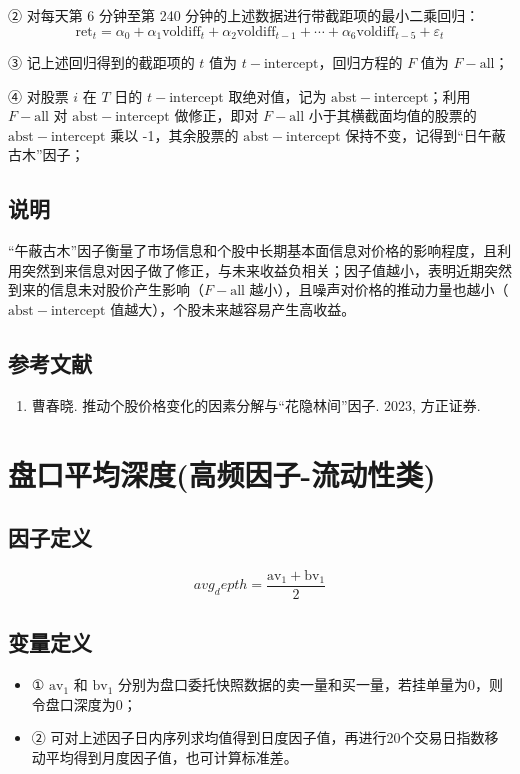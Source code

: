 \documentclass{article}
\begin{document}
② 对每天第 6 分钟至第 240 分钟的上述数据进行带截距项的最小二乘回归：
\begin{equation}
    \mathrm{ret}_t = \alpha_0 + \alpha_1 \mathrm{voldiff}_t + \alpha_2 \mathrm{voldiff}_{t-1} + \cdots + \alpha_6 \mathrm{voldiff}_{t-5} + \varepsilon_t
\end{equation}

③ 记上述回归得到的截距项的 \( t \) 值为 \( t-{\mathrm{intercept}} \)，回归方程的 \( F \) 值为 \( F-{\mathrm{all}} \)；

④ 对股票 \( i \) 在 \( T \) 日的 \( t-{\mathrm{intercept}} \) 取绝对值，记为 \( \mathrm{abst}-{\mathrm{intercept}} \)；利用 \( F-{\mathrm{all}} \) 对 \( \mathrm{abst}-{\mathrm{intercept}} \) 做修正，即对 \( F-{\mathrm{all}} \) 小于其横截面均值的股票的 \( \mathrm{abst}-{\mathrm{intercept}} \) 乘以 -1，其余股票的 \( \mathrm{abst}-{\mathrm{intercept}} \) 保持不变，记得到“日午蔽古木”因子；

\subsection{说明}
“午蔽古木”因子衡量了市场信息和个股中长期基本面信息对价格的影响程度，且利用突然到来信息对因子做了修正，与未来收益负相关；因子值越小，表明近期突然到来的信息未对股价产生影响（\( F-{\mathrm{all}} \) 越小），且噪声对价格的推动力量也越小（\( \mathrm{abst}-{\mathrm{intercept}} \) 值越大），个股未来越容易产生高收益。

\subsection{参考文献}
\begin{enumerate}
    \item 曹春晓. 推动个股价格变化的因素分解与“花隐林间”因子. 2023, 方正证券.
\end{enumerate}

\section{盘口平均深度(高频因子-流动性类)}

\subsection{因子定义}
\begin{equation}
    avg_depth = \frac{\mathrm{av}_1 + \mathrm{bv}_1}{2}
\end{equation}

\subsection{变量定义}
\begin{itemize}
    \item ① \( \mathrm{av}_1 \) 和 \( \mathrm{bv}_1 \) 分别为盘口委托快照数据的卖一量和买一量，若挂单量为0，则令盘口深度为0；
    \item ② 可对上述因子日内序列求均值得到日度因子值，再进行20个交易日指数移动平均得到月度因子值，也可计算标准差。
\end{itemize}
\end{document}
